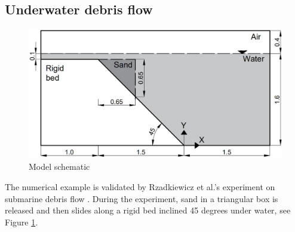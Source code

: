 \documentclass[preprint,12pt]{elsarticle}
\begin{document}
\subsection{\textsf{Underwater debris flow}}
%
%
\begin{figure}[h]
\center
\includegraphics[scale=.3]{SandBoxscheme.jpg}
\caption{Model schematic}
\label{fig:SandBoxModel}
\end {figure}
%
%
The numerical example is validated by Rzadkiewicz et al.'s experiment on submarine debris flow \cite{Rzadkiewicz}. During the experiment, sand in a triangular box is released and then slides along a rigid bed inclined 45 degrees under water, see Figure \ref{fig:SandBoxModel}.\\
%
%
\end{document}
